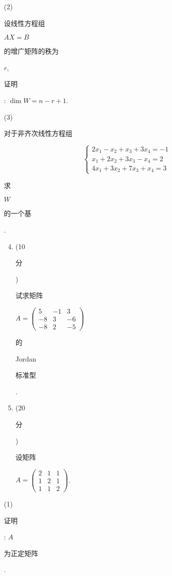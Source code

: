 \documentclass[10pt]{article}
\begin{document}
(2) \begin{CJK}{UTF8}{mj}设线性方程组\end{CJK} $A X=B$ \begin{CJK}{UTF8}{mj}的增广矩阵的秩为\end{CJK} $r$, \begin{CJK}{UTF8}{mj}证明\end{CJK}: $\operatorname{dim} W=n-r+1$.

(3) \begin{CJK}{UTF8}{mj}对于非齐次线性方程组\end{CJK}
$$
\left\{\begin{array}{l}
2 x_{1}-x_{2}+x_{3}+3 x_{4}=-1 \\
x_{1}+2 x_{2}+3 x_{3}-x_{4}=2 \\
4 x_{1}+3 x_{2}+7 x_{3}+x_{4}=3
\end{array}\right.
$$
\begin{CJK}{UTF8}{mj}求\end{CJK} $W$ \begin{CJK}{UTF8}{mj}的一个基\end{CJK}.

\begin{enumerate}
  \setcounter{enumi}{3}
  \item (10 \begin{CJK}{UTF8}{mj}分\end{CJK}) \begin{CJK}{UTF8}{mj}试求矩阵\end{CJK} $A=\left(\begin{array}{ccc}5 & -1 & 3 \\ -8 & 3 & -6 \\ -8 & 2 & -5\end{array}\right)$ \begin{CJK}{UTF8}{mj}的\end{CJK} Jordan \begin{CJK}{UTF8}{mj}标准型\end{CJK}.

  \item (20 \begin{CJK}{UTF8}{mj}分\end{CJK}) \begin{CJK}{UTF8}{mj}设矩阵\end{CJK} $A=\left(\begin{array}{lll}2 & 1 & 1 \\ 1 & 2 & 1 \\ 1 & 1 & 2\end{array}\right)$.

\end{enumerate}
(1) \begin{CJK}{UTF8}{mj}证明\end{CJK}: $A$ \begin{CJK}{UTF8}{mj}为正定矩阵\end{CJK}.
\end{document}
